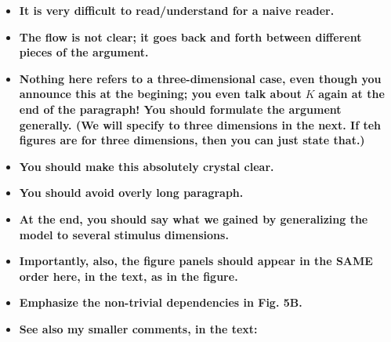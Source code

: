\documentclass[a4paper]{article}%
\begin{document}
\begin{itemize}
\item \textbf{It is very difficult to read/understand for a naive reader.}

\item \textbf{The flow is not clear; it goes back and forth between different
pieces of the argument.}

\item \textbf{Nothing here refers to a three-dimensional case, even though you
announce this at the begining; you even talk about }$K$\textbf{ again at the
end of the paragraph! You should formulate the argument generally. (We will
specify to three dimensions in the next. If teh figures are for three
dimensions, then you can just state that.)}

\item \textbf{You should make this absolutely crystal clear.}

\item \textbf{You should avoid overly long paragraph.}

\item \textbf{At the end, you should say what we gained by generalizing the
model to several stimulus dimensions.  }

\item \textbf{Importantly, also, the figure panels should appear in the SAME
order here, in the text, as in the figure.}

\item \textbf{Emphasize the non-trivial dependencies in Fig. 5B.} 

\item \textbf{See also my smaller comments, in the text:}
\end{itemize}
\end{document}
